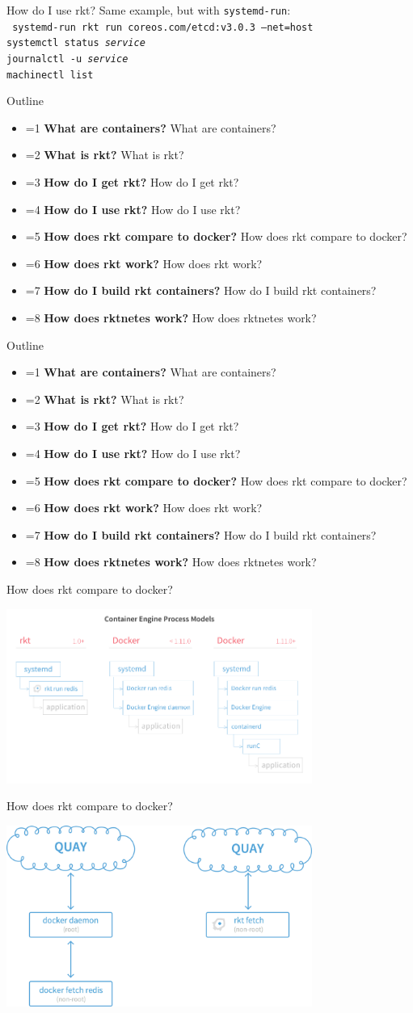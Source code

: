 \documentclass[pdf,aspectratio=169,14pt]{beamer}
\newcommand{\mbold}[3]{
    \ifnum #1=#2
        \textbf{#3}
    \else
        #3
    \fi
}
\newcommand{\outline}[1]{
    \begin{frame}
        Outline
        \begin{itemize}
            \item \mbold{#1}{1}{What are containers?}
            \item \mbold{#1}{2}{What is rkt?}
            \item \mbold{#1}{3}{How do I get rkt?}
            \item \mbold{#1}{4}{How do I use rkt?}
            \item \mbold{#1}{5}{How does rkt compare to docker?}
            \item \mbold{#1}{6}{How does rkt work?}
            \item \mbold{#1}{7}{How do I build rkt containers?}
            \item \mbold{#1}{8}{How does rktnetes work?}
        \end{itemize}
    \end{frame}
}
\begin{document}
\begin{frame}{How do I use rkt?}
    Same example, but with \texttt{systemd-run}: \\
    \vspace{1em}
    \texttt{\noindent
        \pause
        systemd-run rkt run coreos.com/etcd:v3.0.3 --net=host \\
        \pause
        systemctl status \textit{service} \\
        \pause
        journalctl -u \textit{service} \\
        \pause
        machinectl list
    }
\end{frame}


\outline{4}
\outline{5}

\begin{frame}{How does rkt compare to docker?}
    \begin{center}
        \includegraphics[width=0.75\textwidth]{rkt-vs-docker-process-model}
    \end{center}
\end{frame}

\begin{frame}{How does rkt compare to docker?}
    \begin{center}
        \includegraphics[width=0.75\textwidth]{rkt-vs-docker-fetch}
    \end{center}
\end{frame}
\end{document}
